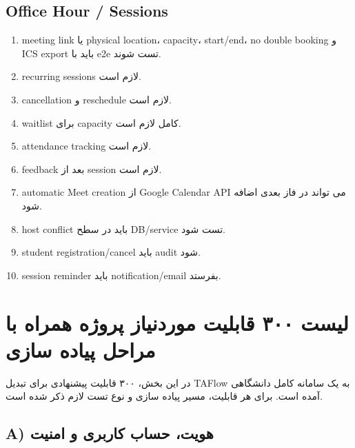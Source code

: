 \documentclass[11pt,a4paper]{article}
\begin{document}
\subsection{Office Hour / Sessions}
\begin{enumerate}[label=\arabic*. ,resume]
\item meeting link یا physical location، capacity، start/end، no double booking و ICS export باید با e2e تست شوند.
\item recurring sessions لازم است.
\item cancellation و reschedule لازم است.
\item waitlist برای capacity کامل لازم است.
\item attendance tracking لازم است.
\item feedback بعد از session لازم است.
\item automatic Meet creation از Google Calendar API می تواند در فاز بعدی اضافه شود.
\item host conflict باید در سطح DB/service تست شود.
\item student registration/cancel باید audit شود.
\item session reminder باید notification/email بفرستد.
\end{enumerate}
\section{لیست ۳۰۰ قابلیت موردنیاز پروژه همراه با مراحل پیاده سازی}
در این بخش، ۳۰۰ قابلیت پیشنهادی برای تبدیل TAFlow به یک سامانه کامل دانشگاهی آمده است. برای هر قابلیت، مسیر پیاده سازی و نوع تست لازم ذکر شده است.
\subsection{A) هویت، حساب کاربری و امنیت}
\end{document}
